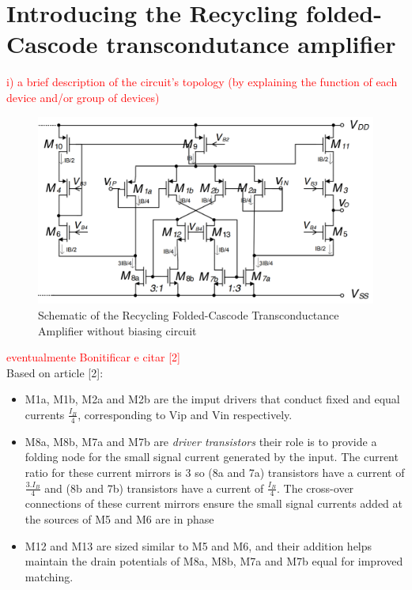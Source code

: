 \section{Introducing the Recycling folded-Cascode transcondutance amplifier}

\textcolor{red}{i) a brief description of the circuit’s topology (by explaining the function of each device and/or group of devices)}

\begin{figure}[H]
    \centering
    \includegraphics[scale=0.3]{report/Images/RFCA_MAIN.png}
    \caption{Schematic of the Recycling Folded-Cascode Transconductance Amplifier without biasing circuit}
    \label{fig:RFCA_MAIN}
\end{figure}

\textcolor{red}{eventualmente Bonitificar e citar [2]}\\

Based on article [2]:
\begin{itemize}    
    \item M1a, M1b, M2a and M2b are the imput drivers that conduct fixed and equal currents $\frac{I_B}{4}$, corresponding to Vip and Vin respectively. 
    \item M8a, M8b, M7a and M7b are \textit{driver transistors} their role is to provide a folding node for the small signal current generated by the input.
    The current ratio for these current mirrors is 3 so (8a and 7a) transistors have a current of $\frac{3.I_B}{4}$ and (8b and 7b) transistors have a current of $\frac{I_B}{4}$. The cross-over connections of these current mirrors ensure the small signal currents added at the sources of M5 and M6 are in phase
    \item   M12 and M13 are sized similar to M5 and M6, and their addition helps maintain the drain potentials
    of M8a, M8b, M7a and M7b equal for improved matching.
\end{itemize}

